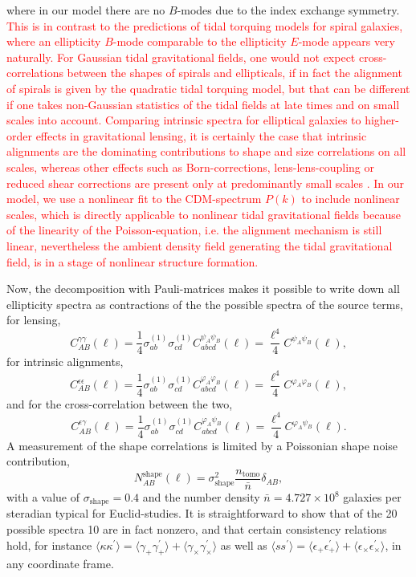 \documentclass[a4paper,fleqn,usenatbib]{mnras}
\newcommand\spirou[1]{\textcolor{red}{#1}}
\newcommand{\bra}{\langle}
\newcommand{\ket}{\rangle}
\begin{document}
where in our model there are no $B$-modes due to the index exchange symmetry. \spirou{This is in contrast to the predictions of tidal torquing models for spiral galaxies, where an ellipticity $B$-mode comparable to the ellipticity $E$-mode appears very naturally. For Gaussian tidal gravitational fields, one would not expect cross-correlations between the shapes of spirals and ellipticals, if in fact the alignment of spirals is given by the quadratic tidal torquing model, but that can be different if one takes non-Gaussian statistics of the tidal fields at late times and on small scales into account. Comparing intrinsic spectra for elliptical galaxies to higher-order effects in gravitational lensing, it is certainly the case that intrinsic alignments are the dominating contributions to shape and size correlations on all scales, whereas other effects such as Born-corrections, lens-lens-coupling or reduced shear corrections are present only at predominantly small scales \citet{krause_weak_2010}. In our model, we use a nonlinear fit to the CDM-spectrum $P(k)$ to include nonlinear scales, which is directly applicable to nonlinear tidal gravitational fields because of the linearity of the Poisson-equation, i.e. the alignment mechanism is still linear, nevertheless the ambient density field generating the tidal gravitational field, is in a stage of nonlinear structure formation.}

Now, the decomposition with Pauli-matrices makes it possible to write down all ellipticity spectra as contractions of the the possible spectra of the source terms, for lensing,
\begin{equation}
C^{\gamma\gamma}_{AB}(\ell) = \frac{1}{4}\sigma^{(1)}_{ab}\sigma^{(1)}_{cd}C^{\psi_A\psi_B}_{abcd}(\ell) = \frac{\ell^4}{4}C^{\psi_A\psi_B}(\ell),
\end{equation}
for intrinsic alignments,
\begin{equation}
C^{\epsilon\epsilon}_{AB}(\ell) = \frac{1}{4}\sigma^{(1)}_{ab}\sigma^{(1)}_{cd}C^{\varphi_A\varphi_B}_{abcd}(\ell) = \frac{\ell^4}{4}C^{\varphi_A\varphi_B}(\ell),
\end{equation}
and for the cross-correlation between the two,
\begin{equation}
C^{\epsilon\gamma}_{AB}(\ell) = \frac{1}{4}\sigma^{(1)}_{ab}\sigma^{(1)}_{cd}C^{\varphi_A\psi_B}_{abcd}(\ell) = \frac{\ell^4}{4}C^{\varphi_A\psi_B}(\ell).
\end{equation}
A measurement of the shape correlations is limited by a Poissonian shape noise contribution,
\begin{equation}
N_{AB}^\mathrm{shape}(\ell) = \sigma^2_\mathrm{shape}\frac{n_\mathrm{tomo}}{\bar{n}}\delta_{AB},
\end{equation}
with a value of $\sigma_\mathrm{shape} = 0.4$ and the number density $\bar{n} = 4.727\times 10^8$ galaxies per steradian typical for Euclid-studies. It is straightforward to show that of the 20 possible spectra 10 are in fact nonzero, and that certain consistency relations hold, for instance $\bra\kappa\kappa^\prime\ket = \bra\gamma_+\gamma_+^\prime\ket + \bra\gamma_\times\gamma_\times^\prime\ket$ as well as $\bra ss^\prime\ket = \bra\epsilon_+\epsilon_+^\prime\ket + \bra\epsilon_\times\epsilon_\times^\prime\ket$, in any coordinate frame.
\end{document}
